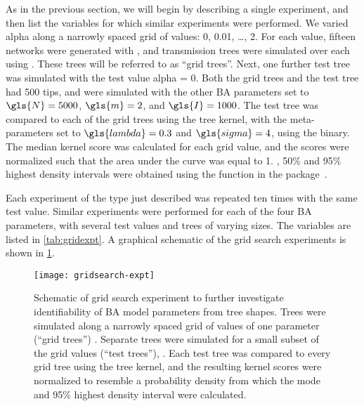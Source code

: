 As in the previous section, we will begin by describing a single experiment,
and then list the variables for which similar experiments were performed. We
varied \gls{alpha} along a narrowly spaced grid of values: 0, 0.01, \ldots, 2.
For each value, fifteen networks were generated with , and
transmission trees were simulated over each using . These
trees will be referred to as ``grid trees''. Next, one further test tree was
simulated with the test value \gls{alpha} = 0. Both the grid trees and the test
tree had 500 tips, and were simulated with the other \gls{BA} parameters set to
 $\gls{N} = 5000$, $\gls{m} = 2$, and $\gls{I} = 1000$.
The test tree was compared to each of the grid trees using the tree kernel,
with the meta-parameters set to $\gls{lambda} = 0.3$ and $\gls{sigma} = 4$,
using the  binary. The median kernel score was calculated
for each grid value, and the scores were normalized such that the area under
the curve was equal to 1.  , 50\% and 95\% highest density intervals were
obtained using the  function in the 
package~\autocite{snow2013teachingdemos}. 

Each experiment of the type just described was repeated ten times with the same
test value. Similar experiments were performed for each of the four \gls{BA}
parameters, with several test values and trees of varying sizes. The variables
are listed in \cref{tab:gridexpt}. A graphical schematic of the grid search
experiments is shown in \cref{fig:gridexpt}. 

\begin{figure}[ht]
    \centering
    \texttt{[image: gridsearch-expt]}
    \caption[
        Schematic of grid search experiment to further investigate
        identifiability of BA model parameters from tree shapes.
    ]{
        Schematic of grid search experiment to further investigate
        identifiability of BA model parameters from tree shapes. Trees were
        simulated along a narrowly spaced grid of values of one parameter
        (``grid trees'') .
        Separate trees were simulated for a small subset of the grid values
        (``test trees''), . Each
        test tree was compared to every grid tree using the tree kernel, and
        the resulting kernel scores were normalized to resemble a probability
        density from which the mode and 95\% highest density interval were
        calculated.
    }
    \label{fig:gridexpt}
\end{figure}

